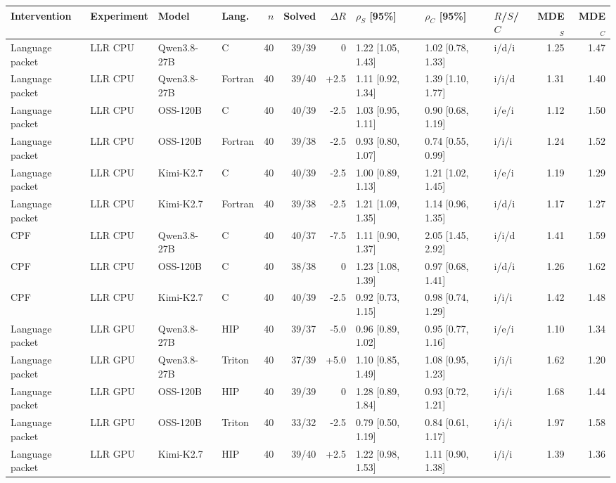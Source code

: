 \begin{widetable}[!p]\revstart
\centering\tiny
\setlength{\tabcolsep}{2.5pt}
\begin{tabular}{@{}llllrrrlllrr@{}}
\toprule
Intervention & Experiment & Model & Lang. & $n$ & Solved & $\Delta R$ & $\rho_S$ [95\%] & $\rho_C$ [95\%] & $R$/$S$/$C$ & MDE$_S$ & MDE$_C$ \\
\midrule
Language packet & LLR CPU & Qwen3.8-27B & C & 40 & 39/39 & 0 & 1.22 [1.05, 1.43] & 1.02 [0.78, 1.33] & i/d/i & 1.25 & 1.47 \\
Language packet & LLR CPU & Qwen3.8-27B & Fortran & 40 & 39/40 & +2.5 & 1.11 [0.92, 1.34] & 1.39 [1.10, 1.77] & i/i/d & 1.31 & 1.40 \\
Language packet & LLR CPU & OSS-120B & C & 40 & 40/39 & -2.5 & 1.03 [0.95, 1.11] & 0.90 [0.68, 1.19] & i/e/i & 1.12 & 1.50 \\
Language packet & LLR CPU & OSS-120B & Fortran & 40 & 39/38 & -2.5 & 0.93 [0.80, 1.07] & 0.74 [0.55, 0.99] & i/i/i & 1.24 & 1.52 \\
Language packet & LLR CPU & Kimi-K2.7 & C & 40 & 40/39 & -2.5 & 1.00 [0.89, 1.13] & 1.21 [1.02, 1.45] & i/e/i & 1.19 & 1.29 \\
Language packet & LLR CPU & Kimi-K2.7 & Fortran & 40 & 39/38 & -2.5 & 1.21 [1.09, 1.35] & 1.14 [0.96, 1.35] & i/d/i & 1.17 & 1.27 \\
CPF & LLR CPU & Qwen3.8-27B & C & 40 & 40/37 & -7.5 & 1.11 [0.90, 1.37] & 2.05 [1.45, 2.92] & i/i/d & 1.41 & 1.59 \\
CPF & LLR CPU & OSS-120B & C & 40 & 38/38 & 0 & 1.23 [1.08, 1.39] & 0.97 [0.68, 1.41] & i/d/i & 1.26 & 1.62 \\
CPF & LLR CPU & Kimi-K2.7 & C & 40 & 40/39 & -2.5 & 0.92 [0.73, 1.15] & 0.98 [0.74, 1.29] & i/i/i & 1.42 & 1.48 \\
Language packet & LLR GPU & Qwen3.8-27B & HIP & 40 & 39/37 & -5.0 & 0.96 [0.89, 1.02] & 0.95 [0.77, 1.16] & i/e/i & 1.10 & 1.34 \\
Language packet & LLR GPU & Qwen3.8-27B & Triton & 40 & 37/39 & +5.0 & 1.10 [0.85, 1.49] & 1.08 [0.95, 1.23] & i/i/i & 1.62 & 1.20 \\
Language packet & LLR GPU & OSS-120B & HIP & 40 & 39/39 & 0 & 1.28 [0.89, 1.84] & 0.93 [0.72, 1.21] & i/i/i & 1.68 & 1.44 \\
Language packet & LLR GPU & OSS-120B & Triton & 40 & 33/32 & -2.5 & 0.79 [0.50, 1.19] & 0.84 [0.61, 1.17] & i/i/i & 1.97 & 1.58 \\
Language packet & LLR GPU & Kimi-K2.7 & HIP & 40 & 39/40 & +2.5 & 1.22 [0.98, 1.53] & 1.11 [0.90, 1.38] & i/i/i & 1.39 & 1.36 \\

\end{tabular}
\end{widetable}

